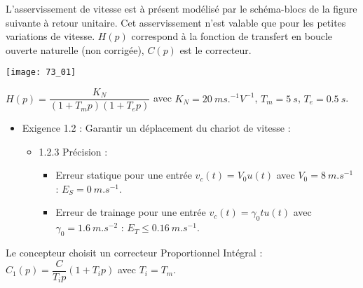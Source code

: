 \normaltrue \difficilefalse \tdifficilefalse
\correctionfalse

\exer{ $\star$ \label{C2:03:prec:73}}
\setcounter{question}{0}

\ifcorrection
\else
{}
\fi


\ifprof
\else
L'asservissement de vitesse est à présent modélisé par le schéma-blocs de la figure suivante à retour unitaire. Cet asservissement n’est valable que pour les petites variations de vitesse. $H(p)$ correspond à la fonction de transfert en boucle ouverte naturelle (non corrigée), $C(p)$ est le correcteur.

\begin{center}
\texttt{[image: 73\_01]}
\end{center}

 $H(p)=\dfrac{K_N}{(1+T_m p)(1+T_e p)}$ avec $K_N = \SI{20}{ms.^{-1}V^{-1}}$, $T_m = \SI{5}{s}$, $T_e = \SI{0,5}{s}$.
 
 \begin{obj}
\begin{itemize}
\item  Exigence 1.2 : Garantir un déplacement du chariot de vitesse : 
\begin{itemize}
\item  1.2.3 Précision :
\begin{itemize}
\item Erreur statique pour une entrée $v_c(t)=V_0 u(t)$ avec $V_0 = \SI{8}{m.s^{-1}}$ : $E_S = \SI{0}{m.s^{-1}}$.
\item Erreur de trainage pour une entrée $v_c(t)=\gamma_0 t  u(t)$ avec $\gamma_0 = \SI{1,6}{m.s^{-2}}$ : $E_T \leq   \SI{0,16}{m.s^{-1}}$.
\end{itemize}
\end{itemize}
\end{itemize}
 \end{obj}
 Le concepteur choisit un correcteur Proportionnel Intégral : $C_1(p)=\dfrac{C}{T_i p} \left(1+T_i p\right)$ avec $T_i = T_m$.
 
\fi
 
 
\ifprof
\else 
\fi

